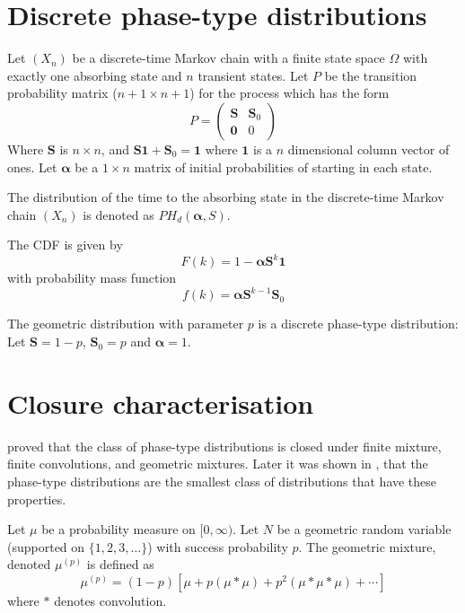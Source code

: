 \section{Discrete phase-type distributions}
\begin{defn}
\cite{neuts1981}
Let $(X_n)$ be a discrete-time Markov chain with a finite state space $\Omega$ with exactly one absorbing state and $n$ transient states.
Let $P$ be the transition probability matrix ($n + 1 \times n + 1$) for the process which has the form
$$
P = \begin{pmatrix}
\mathbf{S} & \mathbf{S}_0\\
\mathbf{0} & 0
\end{pmatrix}
$$
Where $\mathbf{S}$ is $n \times n$, and $\mathbf{S} \mathbf{1}  + \mathbf{S}_0 = \mathbf{1}$ where $\mathbf{1}$ is a $n$ dimensional column vector of ones.
Let $\boldsymbol{\alpha}$ be a $1 \times n$ matrix of initial probabilities of starting in each state.

The distribution of the time to the absorbing state in the discrete-time Markov chain $(X_n)$ is denoted as $PH_d(\boldsymbol{\alpha}, S)$.

The CDF is given by
$$
F(k) = 1 - \boldsymbol{\alpha} \mathbf{S}^k \mathbf{1}
$$
with probability mass function
$$
f(k) = \boldsymbol{\alpha} \mathbf{S}^{k - 1} \mathbf{S}_0
$$
\end{defn}

\begin{example}
The geometric distribution  with parameter $p$ is a discrete phase-type distribution:
Let $\mathbf S = 1 - p$, $\mathbf{S}_0 = p$ and $\boldsymbol{\alpha} = 1$.
\end{example}


\section{Closure characterisation}

\cite{neuts1975} proved that the class of phase-type distributions is closed under finite mixture, finite convolutions, and geometric mixtures.
Later it was shown in \cite{maier1992}, that the phase-type distributions are the smallest class of distributions that have these properties.

\begin{defn} \cite{maier1992}
Let $\mu$ be a probability measure on $[0, \infty)$.
Let $N$ be a geometric random variable (supported on $\{1,2,3,\ldots\}$) with success probability $p$.
The geometric mixture, denoted $\mu^{(p)}$ is defined as
$$
\mu^{(p)} = (1 - p) [\mu + p (\mu * \mu) + p^2 (\mu * \mu * \mu) + \cdots]
$$
where $*$ denotes convolution.
\end{defn}

